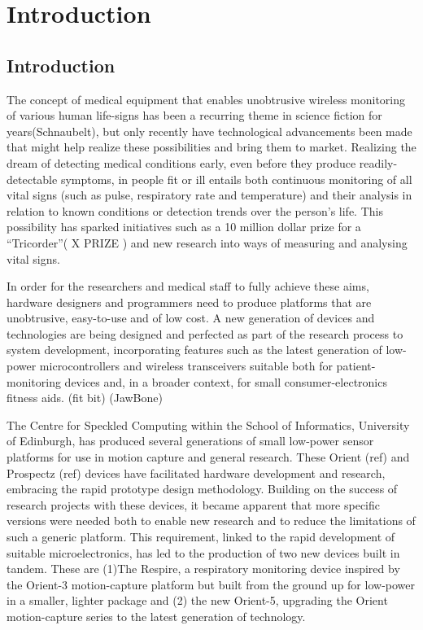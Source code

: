 
\chapter{Introduction}

\section{Introduction}

The concept of medical equipment that enables unobtrusive wireless monitoring of various human
life-signs has been a recurring theme in science fiction for years(Schnaubelt), but only recently have
technological advancements been made that might help realize these possibilities and bring them to
market. Realizing the dream of detecting medical conditions early, even before they produce readily-
detectable symptoms, in people fit or ill entails both continuous monitoring of all vital signs (such as
pulse, respiratory rate and temperature) and their analysis in relation to known conditions or
detection trends over the person’s life. This possibility has sparked initiatives such as a 10 million
dollar prize for a “Tricorder”( X PRIZE ) and new research into ways of measuring and analysing vital
signs.


In order for the researchers and medical staff to fully achieve these aims, hardware designers and
programmers need to produce platforms that are unobtrusive, easy-to-use and of low cost. A new
generation of devices and technologies are being designed and perfected as part of the research
process to system development, incorporating features such as the latest generation of low-power
microcontrollers and wireless transceivers suitable both for patient-monitoring devices
and, in a broader context, for small  consumer-electronics fitness aids. (fit bit) (JawBone)


The Centre for Speckled Computing within the School of Informatics, University of
Edinburgh, has produced several generations of small low-power sensor platforms for use
in motion capture and general research. These Orient (ref) and Prospectz (ref) devices
have facilitated hardware development and research, embracing the rapid prototype
design methodology. Building on the success of research projects with these devices, it
became apparent that more specific versions were needed both to enable new research and to
reduce the limitations of such a generic platform. This requirement, linked to the rapid development
of suitable microelectronics, has led to the production of two new devices built in tandem. These are
(1)The Respire, a respiratory monitoring device inspired by the Orient-3 motion-capture platform
but built from the ground up for low-power in a smaller, lighter package and (2) the new Orient-5,
upgrading the Orient motion-capture series to the latest generation of technology.

